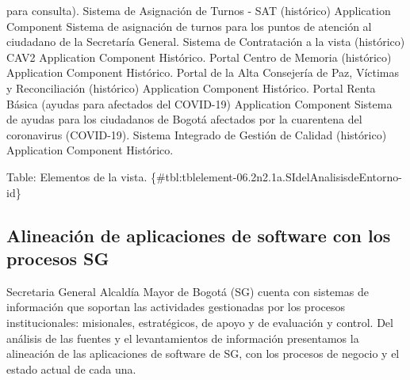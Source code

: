 \documentclass[
	a4paper, %
	12pt, %
]{include/CSSullivanBusinessReport}
\begin{document}
para consulta). \textbar{} \textbar{} Sistema de Asignación de Turnos -
SAT (histórico) \textbar{} Application Component \textbar{} Sistema de
asignación de turnos para los puntos de atención al ciudadano de la
Secretaría General. \textbar{} \textbar{} Sistema de Contratación a la
vista (histórico) CAV2 \textbar{} Application Component \textbar{}
Histórico. \textbar{} \textbar{} Portal Centro de Memoria (histórico)
\textbar{} Application Component \textbar{} Histórico. \textbar{}
\textbar{} Portal de la Alta Consejería de Paz, Víctimas y
Reconciliación (histórico) \textbar{} Application Component \textbar{}
Histórico. \textbar{} \textbar{} Portal Renta Básica (ayudas para
afectados del COVID-19) \textbar{} Application Component \textbar{}
Sistema de ayudas para los ciudadanos de Bogotá afectados por la
cuarentena del coronavirus (COVID-19). \textbar{} \textbar{} Sistema
Integrado de Gestión de Calidad (histórico) \textbar{} Application
Component \textbar{} Histórico. \textbar{}

Table: Elementos de la vista.
\{\#tbl:tblelement-06.2n2.1a.SIdelAnalisisdeEntorno-id\}

\subsection{Alineación de aplicaciones de software con los procesos
SG}\label{sec:alineaciuxf3n-de-aplicaciones-de-software-con-los-procesos-sg}

\begin{quote}
\end{quote}

Secretaria General Alcaldía Mayor de Bogotá (SG) cuenta con sistemas de
información que soportan las actividades gestionadas por los procesos
institucionales: misionales, estratégicos, de apoyo y de evaluación y
control. Del análisis de las fuentes y el levantamientos de información
presentamos la alineación de las aplicaciones de software de SG, con los
procesos de negocio y el estado actual de cada una.
\end{document}
